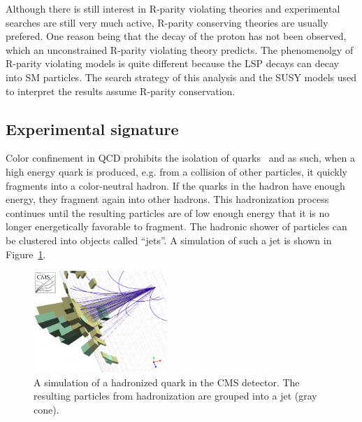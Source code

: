 Although there is still interest in R-parity violating theories and experimental searches are still
very much active, R-parity conserving theories are usually prefered. One reason being that the decay of 
the proton has not been observed, which an unconstrained R-parity violating theory predicts. The 
phenomenolgy of R-parity violating models is quite different because the LSP decays can decay into SM 
particles. The search strategy of this analysis and the SUSY models used to interpret the results assume 
R-parity conservation.

\subsection{Experimental signature}
\label{sec:signature}

Color confinement in QCD prohibits the isolation of quarks~\cite{Ellis:1991qj} 
and as such, when a high energy quark is produced, e.g. 
from a collision of other particles, it quickly fragments into a 
color-neutral hadron. If the quarks in the hadron have enough energy, 
they fragment again into other hadrons. This hadronization process 
continues until the resulting particles are of low enough energy that it
is no longer energetically favorable to fragment. The hadronic shower of
particles can be clustered into objects called ``jets''. A simulation 
of such a jet is shown in Figure~\ref{fig:jets}.  

\begin{figure}[h!t]
  \begin{center}
       \includegraphics[width=0.45\textwidth,]{figures/JetConeAndPFJet.png}
       \caption{A simulation of a hadronized quark in the CMS detector. The
       resulting particles from hadronization are grouped into a jet (gray cone). }
    \label{fig:jets}
  \end{center}
\end{figure}

